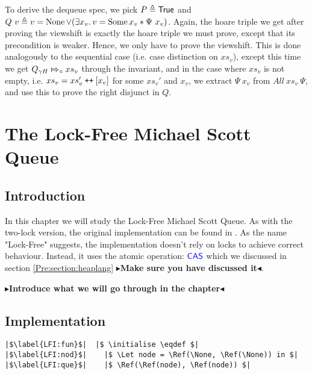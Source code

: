 \documentclass[a4paper, 11pt]{report}
\newcommand{\initialise}{\operatorname{initialize}}
\newcommand\catenate{\mathbin{\text{\ttfamily\upshape ++}}}
\newcommand{\abstractstatefullfrag}[2]{#1 \Mapsto_{\circ} #2}
\newcommand{\todo}[1]{{\color[rgb]{.5,0,0}\textbf{$\blacktriangleright$#1$\blacktriangleleft$}}}
\begin{document}
To derive the dequeue spec, we pick $P \triangleq \textsf{True}$ and $Q \ v \eqdef v = \None \lor (\Exists x_v . v = \Some{x_v} \star \Psi \ x_v)$. Again, the hoare triple we get after proving the viewshift is exactly the hoare triple we must prove, except that its precondition is weaker. Hence, we only have to prove the viewshift. This is done analogously to the sequential case (i.e. case distinction on $xs_v$), except this time we get $\abstractstatefullfrag{Q_{\gname H}}{xs_v}$ through the invariant, and in the case where $xs_v$ is not empty, i.e. $xs_v = xs_v' \catenate [x_v]$ for some $xs_v'$ and $x_v$, we extract $\Psi \ x_v$ from $All\ xs_v \ \Psi$, and use this to prove the right disjunct in $Q$.


\chapter{The Lock-Free Michael Scott Queue}
\label{ch:LFMSQ}

\section{Introduction}
\label{LFMSQ:section:introduction}

In this chapter we will study the Lock-Free Michael Scott Queue. As with the two-lock version, the original implementation can be found in \cite{DBLP:conf/podc/MichaelS96}. As the name "Lock-Free" suggests, the implementation doesn't rely on locks to achieve correct behaviour. Instead, it uses the atomic operation: $\textsf{\color{blue} CAS}$ which we discussed in section \ref{Pre:section:heaplang} \todo{Make sure you have discussed it}.

\todo{Introduce what we will go through in the chapter}

\section{Implementation}
\label{LFMSQ:section:implementation}

\begin{verbatim}
|$\label{LFI:fun}$|  |$ \initialise \eqdef $|
|$\label{LFI:nod}$|    |$ \Let node = \Ref(\None, \Ref(\None)) in $|
|$\label{LFI:que}$|    |$ \Ref(\Ref(node), \Ref(node)) $|
\end{verbatim}
\end{document}
